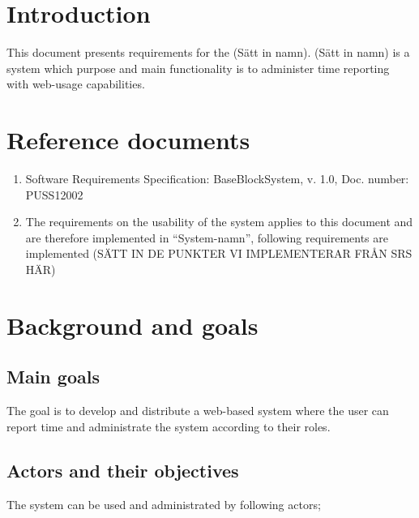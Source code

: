 \documentclass{article}
\date {#1}
\title {
    \documentNumber {01}    
    
    \documentVersion {0.1}
    
    \documentTitle {Template}
    \documentGroup {2}
    
    \documentResponsible {Project management Group}
    \documentAuthors {Project management group}
    
    \documentDate {2021-01-25}
}
\begin{document}
\maketitle
\thispagestyle{empty}

\newpage

\tableofcontents

\newpage



\section{Introduction}

This document presents requirements for the (Sätt in namn). (Sätt in namn) is a system which purpose and main functionality is to administer time reporting with web-usage capabilities. 


\section{Reference documents}

\begin{enumerate}
  \item Software Requirements Specification: BaseBlockSystem, v. 1.0, Doc. number: PUSS12002
  \item The requirements on the usability of the system applies to this document and are therefore implemented in “System-namn”, following requirements are implemented (SÄTT IN DE PUNKTER VI IMPLEMENTERAR FRÅN SRS HÄR)
\end{enumerate}

\section{Background and goals}
\subsection{Main goals}

The goal is to develop and distribute a web-based system where the user can report time and administrate the system according to their roles.

\subsection{Actors and their objectives}
The system can be used and administrated by following actors;
\end{document}
